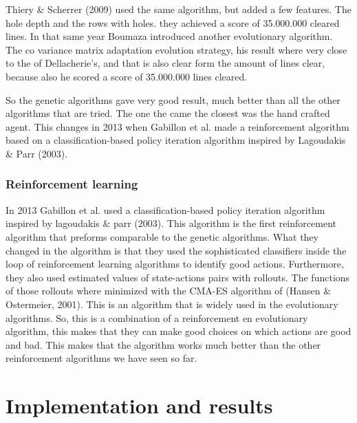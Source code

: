 \documentclass{report}
\begin{document}
Thiery \& Scherrer (2009) used the same algorithm, but added a few features. The hole depth and the rows with holes. they achieved a score of 35.000.000 cleared lines. In that same year Boumaza introduced another evolutionary algorithm. The co variance matrix adaptation evolution strategy, his result where very close to the of Dellacherie's, and that is also clear form the amount of lines clear, because also he scored a score of 35.000.000 lines cleared.

So the genetic algorithms gave very good result, much better than all the other algorithms that are tried. The one the came the closest was the hand crafted agent. This changes in 2013 when Gabillon et al. made a reinforcement algorithm based on a classification-based policy iteration algorithm inspired by Lagoudakis \& Parr (2003).

\subsection{Reinforcement learning}
In 2013 Gabillon et al. used a classification-based policy iteration algorithm inspired by lagoudakis \& parr (2003). This algorithm is the first reinforcement algorithm that preforms comparable to the genetic algorithms. What they changed in the algorithm is that they used the sophisticated classifiers inside the loop of reinforcement learning algorithms to identify good actions. Furthermore, they also used estimated values of state-actions pairs with rollouts. The functions of those rollouts where minimized with the CMA-ES algorithm of (Hansen \& Ostermeier, 2001). This is an algorithm that is widely used in the evolutionary algorithms. So, this is a combination of a reinforcement en evolutionary algorithm, this makes that they can make good choices on which actions are good and bad. This makes that the algorithm works much better than the other reinforcement algorithms we have seen so far.


\chapter{Implementation and results}
\end{document}
